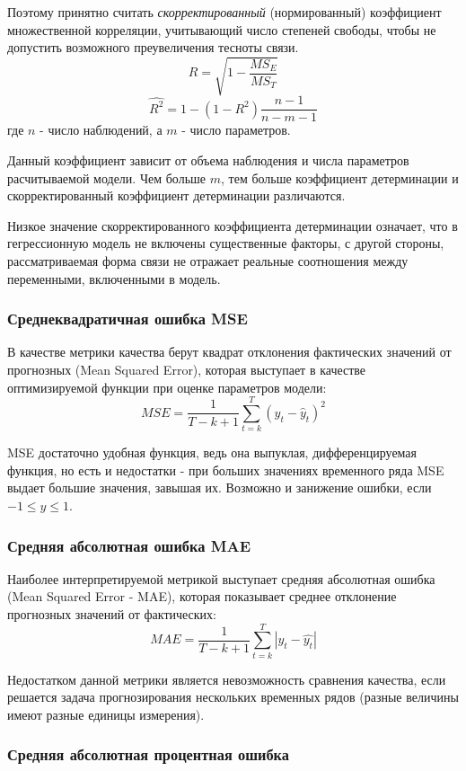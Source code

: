 \documentclass[aps,%
12pt,%
final,%
oneside,
onecolumn,%
musixtex, %
superscriptaddress,%
centertags]{article} %
\theoremstyle{plain}
\theoremstyle{definition}
\theoremstyle{remark}
\begin{document}
Поэтому принятно считать \textit{скорректированный} (нормированный) коэффициент множественной корреляции, учитывающий число степеней свободы, чтобы не допустить возможного преувеличения тесноты связи.
$$ R = \sqrt{1 - \frac{MS_E}{MS_T}}$$
$$ \hat{R^2} = 1 -(1-R^2) \frac{n-1}{n-m-1}$$
где $n$ - число наблюдений, а $m$ - число параметров.

Данный коэффициент зависит от объема наблюдения и числа параметров расчитываемой модели. Чем больше $m$, тем больше коэффициент детерминации и скорректированный коэффициент детерминации различаются.

Низкое значение скорректированного коэффициента детерминации означает, что в гегрессионную модель не включены существенные факторы, с другой стороны, рассматриваемая форма связи не отражает реальные соотношения между переменными, включенными в модель.

\subsubsection{Среднеквадратичная ошибка MSE}

В качестве метрики качества берут квадрат отклонения фактических значений от прогнозных (Mean Squared Error), которая выступает в качестве оптимизируемой функции при оценке параметров модели:
$$MSE = \frac{1}{T-k+1}\sum\limits_{t=k}^T (y_t - \hat{y}_t)^2$$

MSE достаточно удобная функция, ведь она выпуклая, дифференцируемая функция, но есть и недостатки - при больших значениях временного ряда MSE выдает большие значения, завышая их. Возможно и занижение ошибки, если $-1 \leq y \leq 1$.

\subsubsection{Средняя абсолютная ошибка MAE}

Наиболее интерпретируемой метрикой выступает средняя абсолютная ошибка (Mean Squared Error - MAE), которая показывает среднее отклонение прогнозных значений от фактических:
$$MAE = \frac{1}{T-k+1}\sum\limits_{t=k}^T |y_t - \hat{y_t}|$$

Недостатком данной метрики является невозможность сравнения качества, если решается задача прогнозирования нескольких временных рядов (разные величины имеют разные единицы измерения).

\subsubsection{Средняя абсолютная процентная ошибка}
\end{document}
